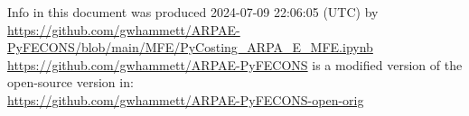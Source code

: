 {\footnotesize
\noindent
Info in this document was produced 2024-07-09 22:06:05 (UTC) by\\
\url{https://github.com/gwhammett/ARPAE-PyFECONS/blob/main/MFE/PyCosting_ARPA_E_MFE.ipynb}\\
\url{https://github.com/gwhammett/ARPAE-PyFECONS}
is a modified version of the open-source version in:\\
\url{https://github.com/gwhammett/ARPAE-PyFECONS-open-orig}
} %
